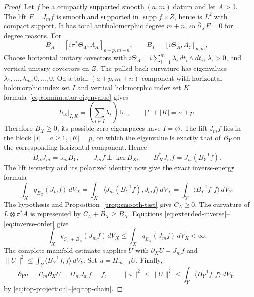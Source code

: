 \documentclass[11pt,reqno]{amsart}
\numberwithin{equation}{section}
\theoremstyle{definition}
\theoremstyle{remark}
\newcommand{\Id}{\operatorname{Id}}
\begin{document}
\begin{proof}
Let $f$ be a compactly supported smooth $(a,m)$ datum and let $A>0$.
The lift $F=J_mf$ is smooth and supported in
$\operatorname{supp}f\times Z$, hence is $L^2$ with compact support.
It has total antiholomorphic degree $m+n$, so
$\bar\partial_XF=0$ for degree reasons.
For
\[
 B_X=[i\pi^*\Theta_A,\Lambda_X]_{a+p,m+n},\qquad
 B_Y=[i\Theta_A,\Lambda_Y]_{a,m},
\]
Choose horizontal unitary covectors with
$i\Theta_A=i\sum_{i=1}^m\lambda_i\,dt_i\wedge d\bar t_i$,
$\lambda_i>0$, and vertical unitary covectors on $Z$.
The pulled-back curvature has eigenvalues
$\lambda_1,\ldots,\lambda_m,0,\ldots,0$.  On a total
$(a+p,m+n)$ component with horizontal holomorphic index set $I$
and vertical holomorphic index set $K$,
formula~\eqref{eq:commutator-eigenvalue} gives
\[
 B_X\big|_{I,K}=\left(\sum_{i\in I}\lambda_i\right)\Id,
 \qquad |I|+|K|=a+p.
\]
Therefore $B_X\ge0$; its possible zero eigenspaces have $I=\varnothing$.
The lift $J_mf$ lies in the block $|I|=a\ge1$, $|K|=p$, on which
the eigenvalue is exactly that of $B_Y$ on the corresponding
horizontal component.  Hence
\[
 B_XJ_m=J_mB_Y,\qquad
 J_mf\perp\ker B_X,\qquad
 B_X^\dagger J_mf=J_m(B_Y^{-1}f).
\]
The lift isometry and its polarized identity now give the exact
inverse-energy formula
\[
 \int_Xq_{B_X}(J_mf)\,dV_X
 =\int_X\langle J_m(B_Y^{-1}f),J_mf\rangle\,dV_X
 =\int_Y\langle B_Y^{-1}f,f\rangle\,dV_Y.
\]
The hypothesis and Proposition~\ref{prop:smooth-test} give
$C_L\ge0$.  The curvature of $L\otimes\pi^*A$ is represented by
$C_L+B_X\ge B_X$.  Equations
\eqref{eq:extended-inverse}--\eqref{eq:inverse-order} give
\[
 \int_Xq_{C_L+B_X}(J_mf)\,dV_X
 \le\int_Xq_{B_X}(J_mf)\,dV_X<\infty.
\]
The complete-manifold estimate supplies $U$ with
$\bar\partial_XU=J_mf$ and
$\|U\|^2\le\int_Y\langle B_Y^{-1}f,f\rangle\,dV_Y$.
Set $u=\Pi_{m-1}U$.  Finally,
\[
 \bar\partial_Yu
   =\Pi_m\bar\partial_XU=\Pi_mJ_mf=f,\qquad
 \|u\|^2\le\|U\|^2
       \le\int_Y\langle B_Y^{-1}f,f\rangle\,dV_Y,
\]
by \eqref{eq:top-projection}--\eqref{eq:top-chain}.
\end{proof}
\end{document}
